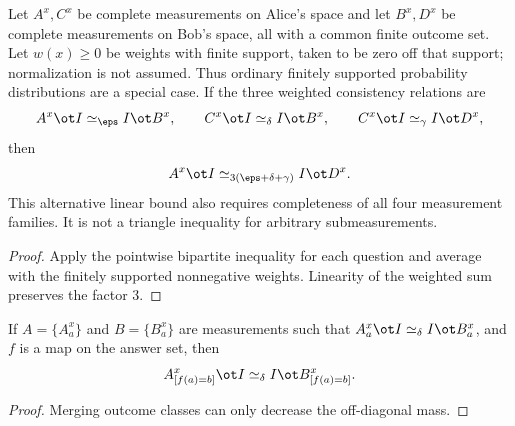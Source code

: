 \begin{lemma}
\label{lem:complete-measurement-consistency-triangle}
	\leanok
	Let $A^x,C^x$ be complete measurements on Alice's space and let
	$B^x,D^x$ be complete measurements on Bob's space, all with a common finite
	outcome set.  Let $w(x)\ge0$ be weights with finite support, taken to be zero
	off that support; normalization is not assumed.  Thus ordinary finitely
	supported probability distributions are a special case.  If the three
	weighted consistency relations are
	\[
		A^x\ot I\simeq_\eps I\ot B^x,
		\qquad C^x\ot I\simeq_\delta I\ot B^x,
		\qquad C^x\ot I\simeq_\gamma I\ot D^x,
	\]
	then
	\[
		A^x\ot I\simeq_{3(\eps+\delta+\gamma)} I\ot D^x.
	\]
	This alternative linear bound also requires completeness of all four
	measurement families.  It is not a triangle inequality for arbitrary
	submeasurements.
\end{lemma}
\begin{proof}
	\leanok
	Apply the pointwise bipartite inequality for each question and average with
	the finitely supported nonnegative weights.  Linearity of the weighted sum
	preserves the factor $3$.
\end{proof}

\begin{lemma}\label{prop:simeq-data-processing}
	\leanok
	If $A=\{A_a^x\}$ and $B=\{B_a^x\}$ are measurements such that $A_a^x \ot I \simeq_\delta I \ot B_a^x$, and $f$ is a map on the answer set, then
	\[
		A_{[f(a)=b]}^x \ot I \simeq_\delta I \ot B_{[f(a)=b]}^x.
	\]
\end{lemma}
\begin{proof}
	\leanok
	Merging outcome classes can only decrease the off-diagonal mass.
\end{proof}


